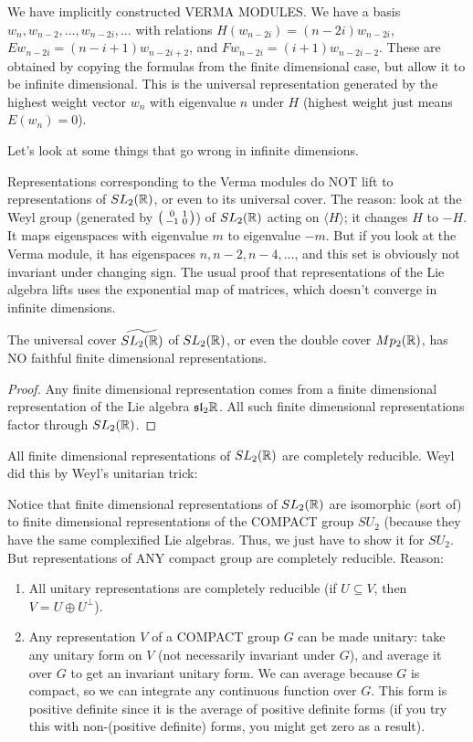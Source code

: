  We have implicitly constructed VERMA MODULES. We have a basis $w_n,w_{n-2},\dots,
 w_{n-2i},\dots$ with relations $H(w_{n-2i})=(n-2i)w_{n-2i}$,
 $Ew_{n-2i} = (n-i+1)w_{n-2i+2}$, and $Fw_{n-2i} = (i+1)w_{n-2i-2}$. These are
 obtained by copying the formulas from the finite dimensional case, but allow it to be
 infinite dimensional. This is the universal representation generated by the highest
 weight vector $w_n$ with eigenvalue $n$ under $H$ (highest weight just means
 $E(w_n)=0$).

 Let's look at some things that go wrong in infinite dimensions.
 \begin{warning}
   Representations corresponding to the Verma modules do NOT lift to representations of
   $SL_2(\mathbb{R})$, or even to its universal cover. The reason: look at the Weyl group
   (generated by $\left( \begin{smallmatrix} 0 & 1 \\ -1 & 0 \end{smallmatrix} \right)$) of $SL_2(\mathbb{R})$ acting on $\langle H\rangle$; it
   changes $H$ to $-H$. It maps eigenspaces with eigenvalue $m$ to eigenvalue $-m$.
   But if you look at the Verma module, it has eigenspaces $n,n-2,n-4,\dots$, and this
   set is obviously not invariant under changing sign. The usual proof that
   representations of the Lie algebra lifts uses the exponential map of matrices,
   which doesn't converge in infinite dimensions.
 \end{warning}
 \begin{remark}
   The universal cover $\widetilde{SL_2(\mathbb{R})}$ of $SL_2(\mathbb{R})$, or even the double
   cover $Mp_2(\mathbb{R})$, has NO faithful finite dimensional representations.
   \begin{proof}
     Any finite dimensional representation comes from a
     finite dimensional representation of the Lie algebra $\mathfrak{sl}_2\mathbb{R}$. All such
     finite dimensional representations factor through $SL_2(\mathbb{R})$.
   \end{proof}
 \end{remark}
 All finite dimensional representations of $SL_2(\mathbb{R})$ are completely reducible. Weyl
 did this by Weyl's unitarian trick:

 Notice that finite dimensional representations of $SL_2(\mathbb{R})$ are isomorphic (sort
 of) to finite dimensional representations of the COMPACT group $SU_2$ (because they
 have the same complexified Lie algebras. Thus, we just have to show it for $SU_2$.
 But representations of ANY compact group are completely reducible. Reason:
 \begin{enumerate}
   \item All unitary representations are completely reducible (if $U\subseteq V$, then
   $V=U\oplus U^\perp$).

   \item Any representation $V$ of a COMPACT group $G$ can be made unitary: take any
   unitary form on $V$ (not necessarily invariant under $G$), and average it over $G$
   to get an invariant unitary form. We can average because $G$ is compact, so we can
   integrate any continuous function over $G$. This form is positive definite since it
   is the average of positive definite forms (if you try this with non-(positive
   definite) forms, you might get zero as a result).
 \end{enumerate}

